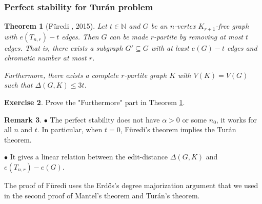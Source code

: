 \documentclass{article}
\newtheorem{theorem}{Theorem}[section]
\theoremstyle{definition}
\newtheorem{remark}[theorem]{Remark}
\newtheorem{exercise}[theorem]{Exercise}
\def\Erdos{Erd\H{o}s}
\def\Turan{Tur\'an}
\begin{document}
\subsubsection{Perfect stability for \Turan{} problem}
\begin{theorem}[F\"uredi \cite{Fredi2015proof}, 2015]{}{}\label{furdedi-perfect-stability}
    Let $t\in\mathbb{N}$ and $G$ be an $n$-vertex $K_{r+1}$-free graph with $e(T_{n,r}) - t$ edges. Then $G$ can be made $r$-partite by removing at most $t$ edges. That is, there exists a subgraph $G' \subseteq G$ with at least $e(G) - t$ edges and chromatic number at most $r$.

    Furthermore, there exists a complete $r$-partite graph $K$ with $V(K)=V(G)$ such that $\Delta(G,K) \leq 3t$.
\end{theorem}

\begin{exercise}
    Prove the "Furthermore" part in Theorem \ref{furdedi-perfect-stability}.
\end{exercise}

\begin{remark}
    $\bullet$ The perfect stability does not have $\alpha >0$ or some $n_0$, it works for all $n$ and $t$. In particular, when $t = 0$, F\"uredi's theorem implies the \Turan{} theorem.

    $\bullet$ It gives a linear relation between the edit-distance $\Delta(G,K)$ and $e(T_{n,r}) - e(G)$.
\end{remark}

The proof of F\"{u}redi uses the \Erdos{}'s degree majorization argument that we used in the second proof of Mantel's theorem and \Turan{}'s theorem.
\end{document}
